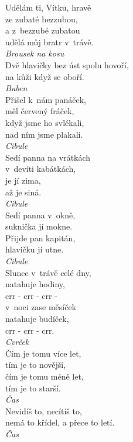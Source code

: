 \begin{multicols}{4}
\noindent
Udělám ti, Vítku, hravě\\
ze zubaté bezzubou,\\
a z~bezzubé zubatou\\
udělá můj bratr v~trávě.\\[1 mm]
{\sl Brousek na kosu}\\

\noindent
Dvě hlavičky bez úst spolu hovoří,\\
na kůži když se oboří.\\[1 mm]
{\sl Buben}\\

\noindent
Přišel k~nám panáček,\\
měl červený fráček,\\
když jsme ho svlékali,\\
nad ním jsme plakali.\\[1 mm]
{\sl Cibule}\\

\noindent
Sedí panna na vrátkách\\
v~devíti kabátkách,\\
je jí zima,\\
až je siná.\\[1 mm]
{\sl Cibule}\\

\noindent
Sedí panna v~okně,\\
suknička jí mokne.\\
Přijde pan kapitán,\\
hlavičku jí utne.\\[1 mm]
{\sl Cibule}\\

\noindent
Slunce v~trávě celé dny,\\
natahuje hodiny,\\
crr - crr - crr -\\
v~noci zase měsíček\\
natahuje budíček,\\
crr - crr - crr.\\[1 mm]
{\sl Cvrček}\\

\noindent
Čím je tomu více let,\\
tím je to novější,\\
čím je tomu méně let,\\
tím je to starší.\\[1 mm]
{\sl Čas}\\

\noindent
Nevidíš to, necítíš to,\\
nemá to křídel, a přece to letí.\\[1 mm]
{\sl Čas}\\


\end{multicols}
